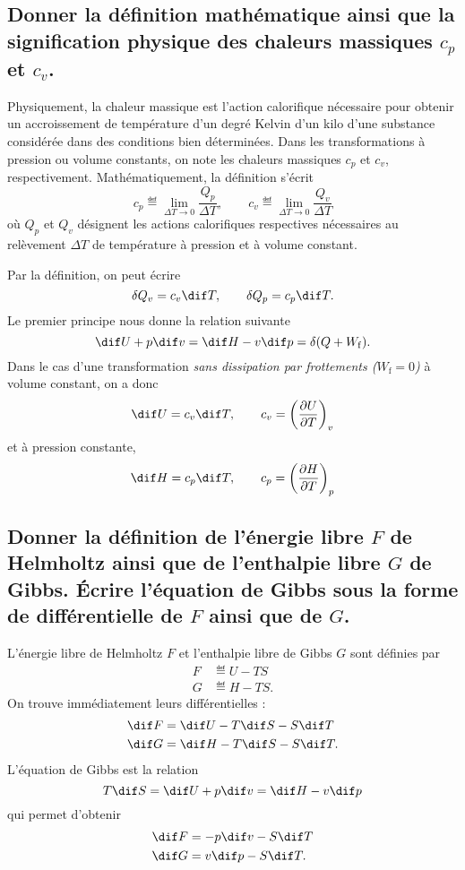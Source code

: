 \subsection{Donner la définition mathématique ainsi que la signification physique des chaleurs massiques $c_p$ et $c_v$.}
Physiquement, la chaleur massique est l'action calorifique nécessaire pour obtenir un accroissement de température d'un degré Kelvin d'un kilo d'une substance considérée dans des conditions bien déterminées.
Dans les transformations à pression ou volume constants, on note les chaleurs massiques $c_p$ et $c_v$, respectivement.
Mathématiquement, la définition s'écrit
\[ c_p \eqdef \lim_{\Delta T \to 0} \frac{Q_p}{\Delta T}, \qquad c_v \eqdef \lim_{\Delta T \to 0} \frac{Q_v}{\Delta T} \]
où $Q_p$ et $Q_v$ désignent les actions calorifiques respectives nécessaires au relèvement $\Delta T$ de température à pression et à volume constant.

Par la définition, on peut écrire
\begin{equation*}
	\delta Q_v = c_v \dif T, \qquad \delta Q_p = c_p \dif T. 
\end{equation*}
Le premier principe nous donne la relation suivante
\begin{equation*} 
	\dif U + p \dif v = \dif H - v \dif p = \delta(Q + W_\mathrm{f}).
\end{equation*}
Dans le cas d'une transformation \emph{sans dissipation par frottements ($W_\mathrm{f} = 0$)} à volume constant, on a donc
\[ \dif U = c_v \dif T, \qquad c_v = \thermodiff{U}{T}{v} \]
et à pression constante,
\[ \dif H = c_p \dif T, \qquad c_p = \thermodiff{H}{T}{p} \]

\subsection{Donner la définition de l'énergie libre $F$ de Helmholtz ainsi que de l'enthalpie libre $G$ de Gibbs. 
Écrire l'équation de Gibbs sous la forme de différentielle de $F$ ainsi que de $G$.}
L'énergie libre de Helmholtz $F$ et l'enthalpie libre de Gibbs $G$ sont définies par
\begin{align*}
	F &\eqdef U - TS \\
	G &\eqdef H - TS.
\end{align*}
On trouve immédiatement leurs différentielles :
\begin{align*}
	\dif F &= \dif U - T \dif S - S \dif T \\
	\dif G &= \dif H - T \dif S - S \dif T.
\end{align*}
L'équation de Gibbs est la relation
\[ T \dif S = \dif U + p \dif v = \dif H - v \dif p \]
qui permet d'obtenir
\begin{align*}
	\dif F &= - p \dif v - S \dif T \\
	\dif G &= v \dif p - S \dif T.
\end{align*}

